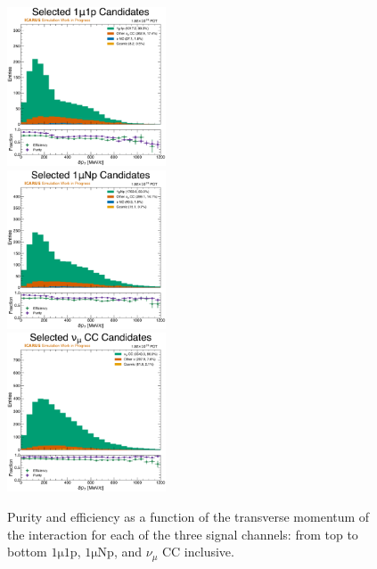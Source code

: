 \begin{figure}[!htb]
    \centering
    \includegraphics[width=0.42\textwidth]{figures/neutrino_selection/selected_hist1d_1mu1p_delta_pT.pdf}\\
    \includegraphics[width=0.42\textwidth]{figures/neutrino_selection/selected_hist1d_1muNp_delta_pT.pdf}\\
    \includegraphics[width=0.42\textwidth]{figures/neutrino_selection/selected_hist1d_1muX_delta_pT.pdf}\\
    \caption{Purity and efficiency as a function of the transverse momentum of the interaction for each of the three signal channels: from top to bottom $\mathrm{1\mu 1p}$, $\mathrm{1\mu Np}$, and $\nu_\mu$ CC inclusive.}
    \label{fig:pureff_delta_pT}
\end{figure}

